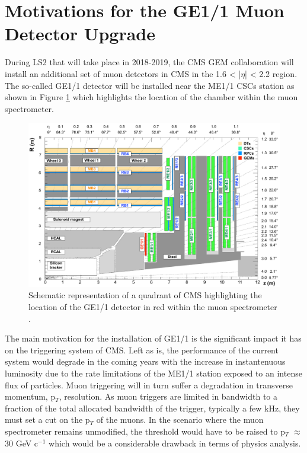   \section{Motivations for the GE1/1 Muon Detector Upgrade}

    During LS2 that will take place in 2018-2019, the CMS GEM collaboration \cite{Colaleo:2021453} will install an additional set of muon detectors in CMS in the 1.6 < |$\eta$| < 2.2 region. The so-called GE1/1 detector will be installed near the ME1/1 CSCs station as shown in Figure \ref{fig:II-1-gem-ge11} which highlights the location of the chamber within the muon spectrometer. \\

    \begin{figure}[h!]
      \centering
      \includegraphics[width=\textwidth]{img/II-1-gem/ge11-quadrant.pdf}
      \caption{Schematic representation of a quadrant of CMS highlighting the location of the GE1/1 detector in red within the muon spectrometer \cite{Colaleo:2021453}.}
      \label{fig:II-1-gem-ge11}
    \end{figure}

    The main motivation for the installation of GE1/1 is the significant impact it has on the triggering system of CMS. Left as is, the performance of the current system would degrade in the coming years with the increase in instantenuous luminosity due to the rate limitations of the ME1/1 station exposed to an intense flux of particles. Muon triggering will in turn suffer a degradation in transverse momentum, p$_T$, resolution. As muon triggers are limited in bandwidth to a fraction of the total allocated bandwidth of the trigger, typically a few kHz, they must set a cut on the p$_T$ of the muons. In the scenario where the muon spectrometer remains unmodified, the threshold would have to be raised to p$_T$ $ \approx $ 30 GeV c$^{-1}$ which would be a considerable drawback in terms of physics analysis. \\

